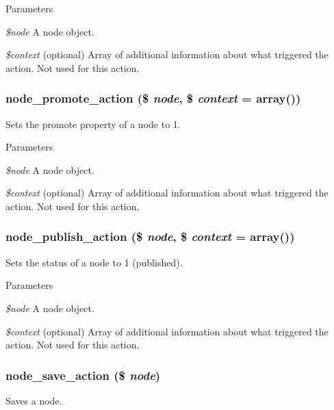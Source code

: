 \begin{DoxyParams}{Parameters}
\item[{\em \$node}]A node object. \item[{\em \$context}](optional) Array of additional information about what triggered the action. Not used for this action. \end{DoxyParams}
\hypertarget{group__actions_ga5e48e8fd6348bdc8e826b84446ed2c0d}{
\subsubsection[{node\_\-promote\_\-action}]{\setlength{\rightskip}{0pt plus 5cm}node\_\-promote\_\-action (\$ {\em node}, \/  \$ {\em context} = {\ttfamily array()})}}
\label{group__actions_ga5e48e8fd6348bdc8e826b84446ed2c0d}
Sets the promote property of a node to 1.


\begin{DoxyParams}{Parameters}
\item[{\em \$node}]A node object. \item[{\em \$context}](optional) Array of additional information about what triggered the action. Not used for this action. \end{DoxyParams}
\hypertarget{group__actions_gadf8322ab430e3fb9cbb7e84db47b744f}{
\subsubsection[{node\_\-publish\_\-action}]{\setlength{\rightskip}{0pt plus 5cm}node\_\-publish\_\-action (\$ {\em node}, \/  \$ {\em context} = {\ttfamily array()})}}
\label{group__actions_gadf8322ab430e3fb9cbb7e84db47b744f}
Sets the status of a node to 1 (published).


\begin{DoxyParams}{Parameters}
\item[{\em \$node}]A node object. \item[{\em \$context}](optional) Array of additional information about what triggered the action. Not used for this action. \end{DoxyParams}
\hypertarget{group__actions_ga84f5af7da5d6f9161307f61e8b345bce}{
\subsubsection[{node\_\-save\_\-action}]{\setlength{\rightskip}{0pt plus 5cm}node\_\-save\_\-action (\$ {\em node})}}
\label{group__actions_ga84f5af7da5d6f9161307f61e8b345bce}
Saves a node.


